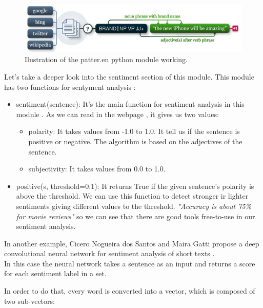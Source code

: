 \documentclass[12pt,twoside]{article}
\theoremstyle{plain}
\theoremstyle{definition}
\theoremstyle{remark}
\begin{document}
		\begin{figure}[h]
			\centering
			\includegraphics[scale=0.8]{./Pictures/python_module.png}
			\caption{Ilustration of the patter.en python module working.} 
		\end{figure}
	
		Let's take a deeper look into the sentiment section of this module. This module has two functions for sentyment analysis \cite{python_module_sentiment}:
		
		\begin{itemize}
			\item sentiment(sentence): It's the main function for sentiment analysis in this module . As we can read in the webpage \cite{python_module_sentiment}, it gives us two values:
			
			\begin{itemize}
				\item polarity: It takes values from -1.0 to 1.0. It tell us if the sentence is positive or negative. The algorithm is based on the adjectives of the sentence.
				\item subjectivity: It takes values from 0.0 to 1.0.
			\end{itemize}
			
			\item positive(s, threshold=0.1): It returns True if the given sentence's polarity is above the threshold. We can use this function to detect stronger ir lighter sentiments giving different values to the threshold. \textit{"Accuracy is about 75\% for movie reviews" }\cite{python_module_sentiment} so we can see that there are good tools free-to-use in our sentiment analysis. 
		\end{itemize}
		
		In another example, Cicero Nogueira dos Santos and Maira Gatti propose a deep convolutional neural network for sentiment analysis of short texts \cite{glorot2011domain}.\\
		
		In this case the neural network takes a sentence as an input and returns a score for each sentiment label in a set. 
		
		In order to do that, every word is converted into a vector, which is composed of two sub-vectors:
		
\end{document}
